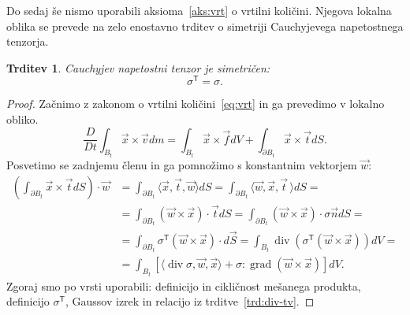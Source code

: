 \documentclass[12pt,a4paper,twoside]{article}
\theoremstyle{definition} %
\theoremstyle{plain} %
\newtheorem{trditev}[definicija]{Trditev}
\numberwithin{equation}{section}
\newcommand{\T}{\mathsf{T}}
\renewcommand{\div}{\operatorname{div}}
\newcommand{\grad}{\operatorname{grad}}
\newcommand{\DD}[2]{\ensuremath{\frac{D #1}{D #2}}}
\newcommand{\DDt}[1]{\DD{#1}{t}}
\newcommand{\vv}{\vec{v}}
\newcommand{\vt}{\vec{t}}
\newcommand{\vw}{\vec{w}}
\newcommand{\vn}{\vec{n}}
\newcommand{\vf}{\vec{f}}
\newcommand{\vx}{\vec{x}}
\newcommand{\ts}{\sigma}
\begin{document}
Do sedaj še nismo uporabili aksioma~\ref{aks:vrt} o vrtilni količini.
Njegova lokalna oblika se prevede na zelo enostavno trditev o simetriji
Cauchyjevega napetostnega tenzorja.
\begin{trditev}
  \label{trd:sigma-symmetric}
  Cauchyjev napetostni tenzor je simetričen:
  \begin{equation}
    \ts^\T = \ts.
  \end{equation}
\end{trditev}
\begin{proof}
Začnimo z zakonom o vrtilni količini~\eqref{eq:vrt} in ga prevedimo v lokalno
obliko.
\begin{equation*}
  \DDt{}\int_{B_t}\vx \times \vv dm = \int_{B_t} \vx \times \vf dV +
  \int_{\partial B_t} \vx\times\vt dS.
\end{equation*}
Posvetimo se zadnjemu členu in ga pomnožimo s konstantnim vektorjem $\vw$:
\begin{align*}
\left(\int_{\partial B_t} \vx \times \vt dS\right)\cdot \vw  &=
  \int_{\partial B_t} \langle \vx, \vt, \vw \rangle dS =
  \int_{\partial B_t} \langle \vw, \vx, \vt\, \rangle dS = \\ &=
  \int_{\partial B_t} (\vw \times \vx) \cdot \vt dS =
  \int_{\partial B_t} (\vw \times \vx) \cdot \ts\vn dS = \\ &=
  \int_{\partial B_t} \ts^\T(\vw \times \vx) \cdot d\vec{S} =
  \int_{B_t} \div (\ts^\T(\vw \times \vx)) dV = \\ &=
\int_{B_t} [\langle \div \ts, \vw, \vx\rangle +  \ts : \grad (\vw \times \vx)] dV.
\end{align*}
Zgoraj smo po vrsti uporabili: definicijo in cikličnost mešanega produkta, definicijo
$\ts^\T\!$, Gaussov izrek in relacijo iz trditve~\ref{trd:div-tv}.


\end{proof}
\end{document}
